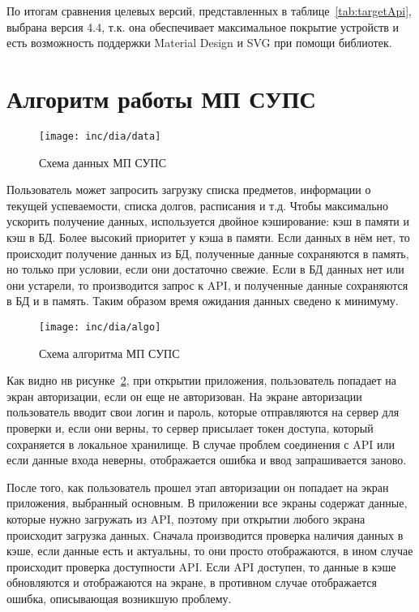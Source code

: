 По итогам сравнения целевых версий, представленных в таблице~\ref{tab:targetApi}, выбрана версия 4.4, т.к. она обеспечивает максимальное покрытие устройств и есть возможность поддержки Material Design и SVG при помощи библиотек.

\section{Алгоритм работы МП СУПС}
\label{sec:algo}

\begin{figure}[ht]
  \texttt{[image: inc/dia/data]}
  \caption{Схема данных МП СУПС}
  \label{fig:data}
\end{figure}

Пользователь может запросить загрузку списка предметов, информации о текущей успеваемости, списка долгов, расписания и т.д.
Чтобы максимально ускорить получение данных, используется двойное кэширование: кэш в памяти и кэш в БД.
Более высокий приоритет у кэша в памяти.
Если данных в нём нет, то происходит получение данных из БД, полученные данные сохраняются в память, но только при условии, если они достаточно свежие.
Если в БД данных нет или они устарели, то производится запрос к API, и полученные данные сохраняются в БД и в память.
Таким образом время ожидания данных сведено к минимуму.

\begin{figure}[ht]
  \texttt{[image: inc/dia/algo]}
  \caption{Схема алгоритма МП СУПС}
  \label{fig:algo}
\end{figure}

Как видно нв рисунке~\ref{fig:algo}, при открытии приложения, пользователь попадает на экран авторизации, если он еще не авторизован.
На экране авторизации пользователь вводит свои логин и пароль, которые отправляются на сервер для проверки и, если они верны, то сервер присылает токен доступа, который сохраняется в локальное хранилище.
В случае проблем соединения с API или если данные входа неверны, отображается ошибка и ввод запрашивается заново.

После того, как пользователь прошел этап авторизации он попадает на экран приложения, выбранный основным.
В приложении все экраны содержат данные, которые нужно загружать из API, поэтому при открытии любого экрана происходит загрузка данных.
Сначала производится проверка наличия данных в кэше, если данные есть и актуальны, то они просто отображаются, в ином случае происходит проверка доступности API\@.
Если API доступен, то данные в кэше обновляются и отображаются на экране, в противном случае отображается ошибка, описывающая возникшую проблему.

